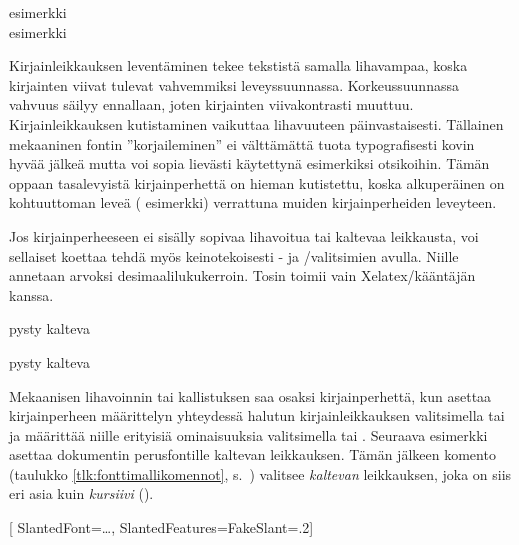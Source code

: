 \begin{tulossis}
  esimerkki \\
  { esimerkki}
\end{tulossis}

Kirjainleikkauksen leventäminen tekee tekstistä samalla lihavampaa,
koska kirjainten viivat tulevat vahvemmiksi leveyssuunnassa.
Korkeussuunnassa vahvuus säilyy ennallaan, joten kirjainten
viivakontrasti muuttuu. Kirjainleikkauksen kutistaminen vaikuttaa
lihavuuteen päinvastaisesti. Tällainen mekaaninen fontin
''korjaileminen'' ei välttämättä tuota typografisesti kovin hyvää jälkeä
mutta voi sopia lievästi käytettynä esimerkiksi otsikoihin. Tämän oppaan
tasalevyistä kirjainperhettä on hieman kutistettu, koska alkuperäinen on
kohtuuttoman leveä ({\ttfamily{}
  esimerkki}) verrattuna muiden kirjainperheiden leveyteen.

Jos%
 kirjainperheeseen ei sisälly
sopivaa lihavoitua tai kaltevaa leikkausta, voi sellaiset koettaa tehdä
myös keinotekoisesti - ja
\-/valitsimien avulla. Niille annetaan arvoksi
desimaalilukukerroin. Tosin  toimii vain
Xelatex\-/kääntäjän kanssa.

\begin{koodilohkosis}
  pysty { kalteva}
\end{koodilohkosis}

\begin{tulossis}
  pysty { kalteva}
\end{tulossis}

Mekaanisen lihavoinnin tai kallistuksen saa osaksi kirjainperhettä, kun
asettaa kirjainperheen määrittelyn yhteydessä halutun kirjainleikkauksen
valitsimella  tai  ja määrittää
niille erityisiä ominaisuuksia valitsimella  tai
. Seuraava esimerkki asettaa dokumentin
perusfontille kaltevan leikkauksen. Tämän jälkeen komento  (taulukko \ref{tlk:fonttimallikomennot},
s.~\pageref{tlk:fonttimallikomennot}) valitsee \textsl{kaltevan}
leikkauksen, joka on siis eri asia kuin \textit{kursiivi} ().

\begin{koodilohkosis}
  \setmainfont{…}[
    SlantedFont={…}, %
    SlantedFeatures={FakeSlant=.2}]
\end{koodilohkosis}

